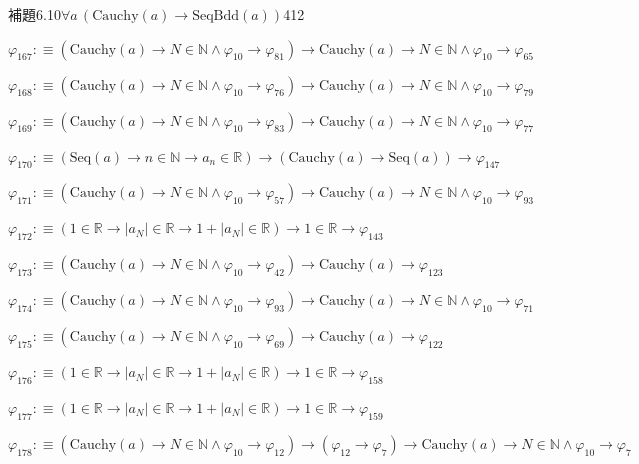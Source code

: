 \begin{fullproof}{補題6.10}{$\forall a\,(\mathrm{Cauchy}(a) \to \mathrm{SeqBdd}(a))$}{412}
\begin{abbrevlist}
\item $\varphi_{167} :\equiv (\mathrm{Cauchy}(a) \to N \in \mathbb{N} \land \varphi_{10} \to \varphi_{81}) \to \mathrm{Cauchy}(a) \to N \in \mathbb{N} \land \varphi_{10} \to \varphi_{65}$
\item $\varphi_{168} :\equiv (\mathrm{Cauchy}(a) \to N \in \mathbb{N} \land \varphi_{10} \to \varphi_{76}) \to \mathrm{Cauchy}(a) \to N \in \mathbb{N} \land \varphi_{10} \to \varphi_{79}$
\item $\varphi_{169} :\equiv (\mathrm{Cauchy}(a) \to N \in \mathbb{N} \land \varphi_{10} \to \varphi_{83}) \to \mathrm{Cauchy}(a) \to N \in \mathbb{N} \land \varphi_{10} \to \varphi_{77}$
\item $\varphi_{170} :\equiv (\mathrm{Seq}(a) \to n \in \mathbb{N} \to a_{n} \in \mathbb{R}) \to (\mathrm{Cauchy}(a) \to \mathrm{Seq}(a)) \to \varphi_{147}$
\item $\varphi_{171} :\equiv (\mathrm{Cauchy}(a) \to N \in \mathbb{N} \land \varphi_{10} \to \varphi_{57}) \to \mathrm{Cauchy}(a) \to N \in \mathbb{N} \land \varphi_{10} \to \varphi_{93}$
\item $\varphi_{172} :\equiv (1 \in \mathbb{R} \to \lvert a_{N} \rvert \in \mathbb{R} \to 1 + \lvert a_{N} \rvert \in \mathbb{R}) \to 1 \in \mathbb{R} \to \varphi_{143}$
\item $\varphi_{173} :\equiv (\mathrm{Cauchy}(a) \to N \in \mathbb{N} \land \varphi_{10} \to \varphi_{42}) \to \mathrm{Cauchy}(a) \to \varphi_{123}$
\item $\varphi_{174} :\equiv (\mathrm{Cauchy}(a) \to N \in \mathbb{N} \land \varphi_{10} \to \varphi_{93}) \to \mathrm{Cauchy}(a) \to N \in \mathbb{N} \land \varphi_{10} \to \varphi_{71}$
\item $\varphi_{175} :\equiv (\mathrm{Cauchy}(a) \to N \in \mathbb{N} \land \varphi_{10} \to \varphi_{69}) \to \mathrm{Cauchy}(a) \to \varphi_{122}$
\item $\varphi_{176} :\equiv (1 \in \mathbb{R} \to \lvert a_{N} \rvert \in \mathbb{R} \to 1 + \lvert a_{N} \rvert \in \mathbb{R}) \to 1 \in \mathbb{R} \to \varphi_{158}$
\item $\varphi_{177} :\equiv (1 \in \mathbb{R} \to \lvert a_{N} \rvert \in \mathbb{R} \to 1 + \lvert a_{N} \rvert \in \mathbb{R}) \to 1 \in \mathbb{R} \to \varphi_{159}$
\item $\varphi_{178} :\equiv (\mathrm{Cauchy}(a) \to N \in \mathbb{N} \land \varphi_{10} \to \varphi_{12}) \to (\varphi_{12} \to \varphi_{7}) \to \mathrm{Cauchy}(a) \to N \in \mathbb{N} \land \varphi_{10} \to \varphi_{7}$

\end{abbrevlist}
\end{fullproof}
